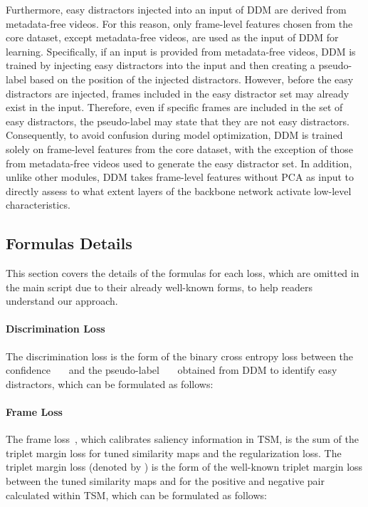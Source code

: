 \documentclass[10pt,twocolumn,letterpaper]{article}
\begin{document}
        Furthermore, easy distractors injected into an input of DDM are derived from metadata-free videos. For this reason, only frame-level features chosen from the core dataset, except metadata-free videos, are used as the input of DDM for learning. Specifically, if an input is provided from metadata-free videos, DDM is trained by injecting easy distractors into the input and then creating a pseudo-label based on the position of the injected distractors. However, before the easy distractors are injected, frames included in the easy distractor set may already exist in the input. Therefore, even if specific frames are included in the set of easy distractors, the pseudo-label may state that they are not easy distractors. Consequently, to avoid confusion during model optimization, DDM is trained solely on frame-level features from the core dataset, with the exception of those from metadata-free videos used to generate the easy distractor set. In addition, unlike other modules, DDM takes frame-level features without PCA as input to directly assess to what extent layers of the backbone network activate low-level characteristics.
        
        
    \subsection{Formulas Details}\label{formula}
        This section covers the details of the formulas for each loss, which are omitted in the main script due to their already well-known forms, to help readers understand our approach.
        \paragraph{Discrimination Loss \\}
        The discrimination loss  is the form of the binary cross entropy loss between the confidence~~~ and the pseudo-label~~~ obtained from DDM to identify easy distractors, which can be formulated as follows:
        

        \paragraph{Frame Loss \\}
        The frame loss~, which calibrates saliency information in TSM, is the sum of the triplet margin loss for tuned similarity maps and the regularization loss. The triplet margin loss (denoted by ) is the form of the well-known triplet margin loss between the tuned similarity maps  and  for the positive and negative pair calculated within TSM, which can be formulated as follows:
        
\end{document}
